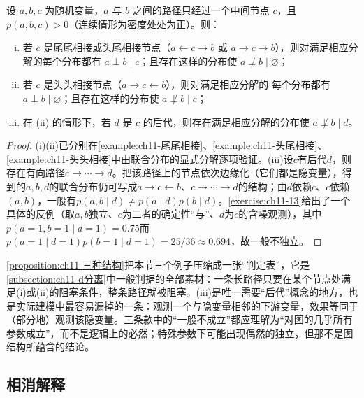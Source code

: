\documentclass[../../main.tex]{subfiles}
\begin{document}
\begin{proposition}[三种基本结构的条件独立性]\label{proposition:ch11-三种结构}
设 $a,b,c$ 为随机变量，$a$ 与 $b$ 之间的路径只经过一个中间节点 $c$，且
$p(a,b,c)>0$（连续情形为密度处处为正）。则：
\begin{enumerate}[(i)]
  \item 若 $c$ 是尾尾相接或头尾相接节点（$a\leftarrow c\rightarrow b$ 或
        $a\rightarrow c\rightarrow b$），则对满足相应分解的每个分布都有
        $a\perp b\mid c$；且存在这样的分布使 $a\not\perp b\mid\varnothing$；
  \item 若 $c$ 是头头相接节点（$a\rightarrow c\leftarrow b$），则对满足相应分解的
        每个分布都有 $a\perp b\mid\varnothing$；且存在这样的分布使
        $a\not\perp b\mid c$；
  \item 在 (ii) 的情形下，若 $d$ 是 $c$ 的后代，则存在满足相应分解的分布使
        $a\not\perp b\mid d$。
\end{enumerate}
\end{proposition}

\begin{proof}
(i)(ii)已分别在\cref{example:ch11-尾尾相接}、\cref{example:ch11-头尾相接}、\cref{example:ch11-头头相接}中由联合分布的显式分解逐项验证。(iii)设$c$有后代$d$，则存在有向路径$c\to\cdots\to d$。把该路径上的节点依次边缘化（它们都是隐变量），得到的$a,b,d$的联合分布仍可写成$a\to c\leftarrow b$、$c\to\cdots\to d$的结构；由$d$依赖$c$、$c$依赖$(a,b)$，一般有$p(a,b\mid d)\neq p(a\mid d)p(b\mid d)$。\cref{exercise:ch11-13}给出了一个具体的反例（取$a,b$独立、$c$为二者的确定性“与”、$d$为$c$的含噪观测），其中$p(a=1,b=1\mid d=1)=0.75$而$p(a=1\mid d=1)p(b=1\mid d=1)=25/36\approx0.694$，故一般不独立。
\end{proof}

\begin{remark}
\cref{proposition:ch11-三种结构}把本节三个例子压缩成一张“判定表”，它是\cref{subsection:ch11-d分离}中一般判据的全部素材：一条长路径只要在某个节点处满足(i)或(ii)的阻塞条件，整条路径就被阻塞。(iii)是唯一需要“后代”概念的地方，也是实际建模中最容易漏掉的一条：观测一个与隐变量相邻的下游变量，效果等同于（部分地）观测该隐变量。三条款中的“一般不成立”都应理解为“对图的几乎所有参数成立”，而不是逻辑上的必然；特殊参数下可能出现偶然的独立，但那不是图结构所蕴含的结论。
\end{remark}

\subsection{相消解释}\label{subsection:ch11-相消解释}
\end{document}
